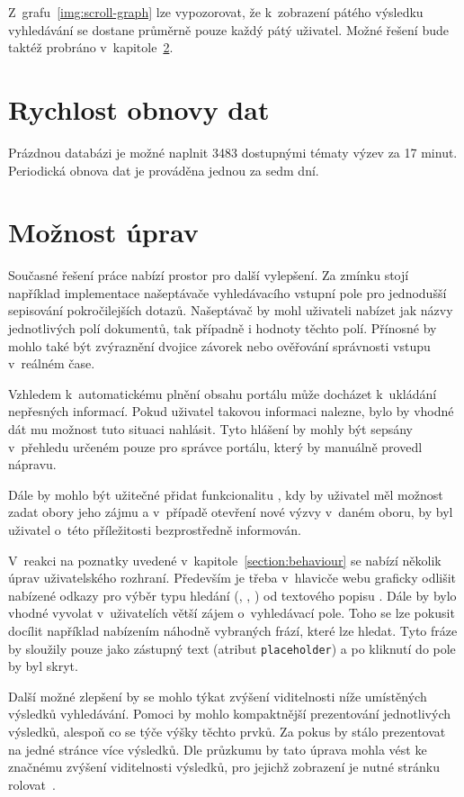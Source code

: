 Z~grafu~\ref{img:scroll-graph} lze vypozorovat, že k~zobrazení pátého výsledku vyhledávání se dostane průměrně pouze každý pátý uživatel. Možné řešení bude taktéž probráno v~kapitole~\ref{section:improvements}.


\section{Rychlost obnovy dat}
Prázdnou databázi je možné naplnit 3483 dostupnými tématy výzev za 17 minut. Periodická obnova dat je prováděna jednou za sedm dní.


\section{Možnost úprav}\label{section:improvements}
Současné řešení práce nabízí prostor pro další vylepšení. Za zmínku stojí například implementace našeptávače vyhledávacího vstupní pole pro jednodušší sepisování pokročilejších dotazů. Našeptávač by mohl uživateli nabízet jak názvy jednotlivých polí dokumentů, tak případně i hodnoty těchto polí. Přínosné by mohlo také být zvýraznění dvojice závorek nebo ověřování správnosti vstupu v~reálném čase.

Vzhledem k~automatickému plnění obsahu portálu může docházet k~ukládání nepřesných informací. Pokud uživatel takovou informaci nalezne, bylo by vhodné dát mu možnost tuto situaci nahlásit. Tyto hlášení by mohly být sepsány v~přehledu určeném pouze pro správce portálu, který by manuálně provedl nápravu. 

Dále by mohlo být užitečné přidat funkcionalitu , kdy by uživatel měl možnost zadat obory jeho zájmu a v~případě otevření nové výzvy v~daném oboru, by byl uživatel o~této příležitosti bezprostředně informován.

V~reakci na poznatky uvedené v~kapitole~\ref{section:behaviour} se nabízí několik úprav uživatelského rozhraní. Především je třeba v~hlavicče webu graficky odlišit nabízené odkazy pro výběr typu hledání (, , ) od textového popisu .
Dále by bylo vhodné vyvolat v~uživatelích větší zájem o~vyhledávací pole. Toho se lze pokusit docílit například nabízením náhodně vybraných frází, které lze hledat. Tyto fráze by sloužily pouze jako zástupný text (atribut \texttt{placeholder}) a po kliknutí do pole by byl skryt. 

Další možné zlepšení by se mohlo týkat zvýšení viditelnosti níže umístěných výsledků vyhledávání. Pomoci by mohlo kompaktnější prezentování jednotlivých výsledků, alespoň co se týče výšky těchto prvků. Za pokus by stálo prezentovat na jedné stránce více výsledků. Dle průzkumu by tato úprava mohla vést ke značnému zvýšení viditelnosti výsledků, pro jejichž zobrazení je nutné stránku rolovat~\cite{bib:scroll}.



